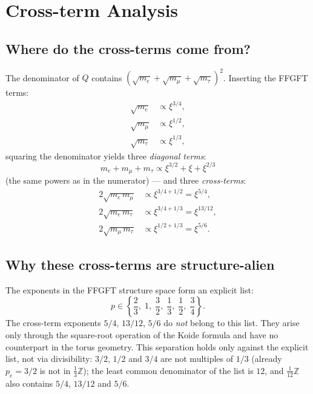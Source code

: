 \section{Cross-term Analysis}

\subsection{Where do the cross-terms come from?}

The denominator of $Q$ contains $(\sqrt{m_e}+\sqrt{m_\mu}+\sqrt{m_\tau})^2$.
Inserting the FFGFT terms:
\begin{align*}
  \sqrt{m_e} &\propto \xi^{3/4}, \\
  \sqrt{m_\mu} &\propto \xi^{1/2}, \\
  \sqrt{m_\tau} &\propto \xi^{1/3},
\end{align*}
squaring the denominator yields three \emph{diagonal terms}:
\begin{equation}
  m_e + m_\mu + m_\tau \propto \xi^{3/2} + \xi + \xi^{2/3}
\end{equation}
(the same powers as in the numerator) — and three \emph{cross-terms}:
\begin{align}
  2\sqrt{m_e\,m_\mu} &\propto \xi^{3/4+1/2} = \xi^{5/4}, \label{eq:k1}\\
  2\sqrt{m_e\,m_\tau} &\propto \xi^{3/4+1/3} = \xi^{13/12}, \label{eq:k2}\\
  2\sqrt{m_\mu\,m_\tau} &\propto \xi^{1/2+1/3} = \xi^{5/6}. \label{eq:k3}
\end{align}

\subsection{Why these cross-terms are structure-alien}

The exponents in the FFGFT structure space form an explicit list:
\[
  p \in \left\{\frac{2}{3},\; 1,\; \frac{3}{2},\; \frac{1}{3},\; \frac{1}{2},\; \frac{3}{4}\right\}.
\]
The cross-term exponents $5/4$, $13/12$, $5/6$ do \emph{not} belong to this
list. They arise only through the square-root operation of the Koide formula
and have no counterpart in the torus geometry.
This separation holds only against the explicit list, not via divisibility:
$3/2$, $1/2$ and $3/4$ are not multiples of $1/3$ (already $p_e = 3/2$ is not
in $\frac{1}{3}\mathbb{Z}$); the least common denominator of the list is $12$,
and $\frac{1}{12}\mathbb{Z}$ also contains $5/4$, $13/12$ and $5/6$.

